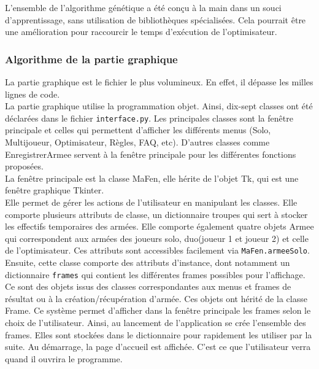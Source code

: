 \documentclass[a4paper]{article} %
\begin{document}
L'ensemble de l'algorithme génétique a été conçu à la main dans un souci d'apprentissage, sans utilisation de bibliothèques spécialisées. Cela pourrait être une amélioration pour raccourcir le temps d'exécution de l'optimisateur.

		\subsubsection{Algorithme de la partie graphique}\label{algoInterface}
La partie graphique est le fichier le plus volumineux. En effet, il dépasse les milles lignes de code.\\

La partie graphique utilise la programmation objet. Ainsi, dix-sept classes ont été déclarées dans le fichier \texttt{interface.py}. Les principales classes sont la fenêtre principale et celles qui permettent d'afficher les différents menus (Solo, Multijoueur, Optimisateur, Règles, FAQ, etc). D'autres classes comme EnregistrerArmee servent à la fenêtre principale pour les différentes fonctions proposées.\\

La fenêtre principale est la classe MaFen, elle hérite de l'objet Tk, qui est une fenêtre graphique Tkinter.
\\
Elle permet de gérer les actions de l'utilisateur en manipulant les classes. Elle comporte plusieurs attributs de classe, un dictionnaire troupes qui sert à stocker les effectifs temporaires des armées. Elle comporte également quatre objets Armee qui correspondent aux armées des joueurs solo, duo(joueur 1 et joueur 2) et celle de l'optimisateur. Ces attributs sont accessibles facilement via \texttt{MaFen.armeeSolo}.\\

Ensuite, cette classe comporte des attributs d'instance, dont notamment un dictionnaire \texttt{frames} qui contient les différentes frames possibles pour l'affichage. Ce sont des objets issus des classes correspondantes aux menus et frames de résultat ou à la  création/récupération d'armée. Ces objets ont hérité de la classe Frame. Ce système permet d'afficher dans la fenêtre principale les frames selon le choix de l'utilisateur. Ainsi, au lancement de l'application se crée l'ensemble des frames. Elles sont stockées dans le dictionnaire pour rapidement les utiliser par la suite. 
Au démarrage, la page d'accueil est affichée. C'est ce que l'utilisateur verra quand il ouvrira le programme. \\
\end{document}
